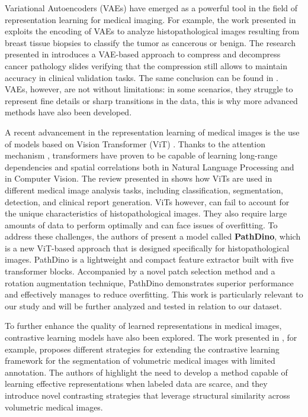\documentclass[peerreview]{IEEEtran}
\begin{document}
Variational Autoencoders (VAEs) have emerged as a powerful tool in the field of representation learning for medical imaging. For example, the work presented in \cite{breastcancer} exploits the encoding of VAEs to analyze histopathological images resulting from breast tissue biopsies to classify the tumor as cancerous or benign. The research presented in \cite{Nasr_2023} introduces a VAE-based approach to compress and decompress cancer pathology slides verifying that the compression still allows to maintain accuracy in clinical validation tasks. The same conclusion can be found in \cite{digpat}.
VAEs, however, are not without limitations: in some scenarios, they struggle to represent fine details or sharp transitions in the data, this is why more advanced methods have also been developed.

A recent advancement in the representation learning of medical images is the use of models based on Vision Transformer (ViT) \cite{vit}. Thanks to the attention mechanism \cite{attention}, transformers have proven to be capable of learning long-range dependencies and spatial correlations both in Natural Language Processing and in Computer Vision. The review presented in \cite{reviewvit} shows how ViTs are used in different medical image analysis tasks, including classification, segmentation, detection, and clinical report generation. ViTs however, can fail to account for the unique characteristics of histopathological images. They also require large amounts of data to perform optimally and can face issues of overfitting. To address these challenges, the authors of \cite{pathdino} present a model called \textbf{PathDino}, which is a new ViT-based approach that is designed specifically for histopathological images. PathDino is a lightweight and compact feature extractor built with five transformer blocks. Accompanied by a novel patch selection method and a rotation augmentation technique, PathDino demonstrates superior performance and effectively manages to reduce overfitting. This work is particularly relevant to our study and will be further analyzed and tested in relation to our dataset.

To further enhance the quality of learned representations in medical images, contrastive learning models have also been explored. The work presented in \cite{contrglobloc}, for example, proposes different strategies for extending the contrastive learning framework for the segmentation of volumetric medical images with limited
annotation. The authors of \cite{contr2} highlight the need to develop a method capable of learning effective representations when labeled data are scarce, and they introduce novel contrasting strategies that leverage structural similarity across volumetric medical images. 
\end{document}
